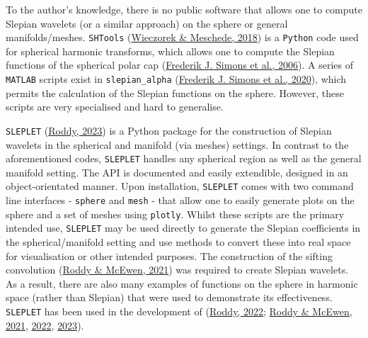 \documentclass[
]{article}
\begin{document}
To the author's knowledge, there is no public software that allows one
to compute Slepian wavelets (or a similar approach) on the sphere or
general manifolds/meshes. \texttt{SHTools}
(\protect\hyperlink{ref-Wieczorek2018}{Wieczorek \& Meschede, 2018}) is
a \texttt{Python} code used for spherical harmonic transforms, which
allows one to compute the Slepian functions of the spherical polar cap
(\protect\hyperlink{ref-Simons2006}{Frederik J. Simons et al., 2006}). A
series of \texttt{MATLAB} scripts exist in \texttt{slepian\_alpha}
(\protect\hyperlink{ref-Simons2020}{Frederik J. Simons et al., 2020}),
which permits the calculation of the Slepian functions on the sphere.
However, these scripts are very specialised and hard to generalise.

\texttt{SLEPLET} (\protect\hyperlink{ref-Roddy2023a}{Roddy, 2023}) is a
Python package for the construction of Slepian wavelets in the spherical
and manifold (via meshes) settings. In contrast to the aforementioned
codes, \texttt{SLEPLET} handles any spherical region as well as the
general manifold setting. The API is documented and easily extendible,
designed in an object-orientated manner. Upon installation,
\texttt{SLEPLET} comes with two command line interfaces -
\texttt{sphere} and \texttt{mesh} - that allow one to easily generate
plots on the sphere and a set of meshes using \texttt{plotly}. Whilst
these scripts are the primary intended use, \texttt{SLEPLET} may be used
directly to generate the Slepian coefficients in the spherical/manifold
setting and use methods to convert these into real space for
visualisation or other intended purposes. The construction of the
sifting convolution (\protect\hyperlink{ref-Roddy2021}{Roddy \& McEwen,
2021}) was required to create Slepian wavelets. As a result, there are
also many examples of functions on the sphere in harmonic space (rather
than Slepian) that were used to demonstrate its effectiveness.
\texttt{SLEPLET} has been used in the development of
(\protect\hyperlink{ref-Roddy2022a}{Roddy, 2022};
\protect\hyperlink{ref-Roddy2021}{Roddy \& McEwen, 2021},
\protect\hyperlink{ref-Roddy2022}{2022},
\protect\hyperlink{ref-Roddy2023}{2023}).
\end{document}
